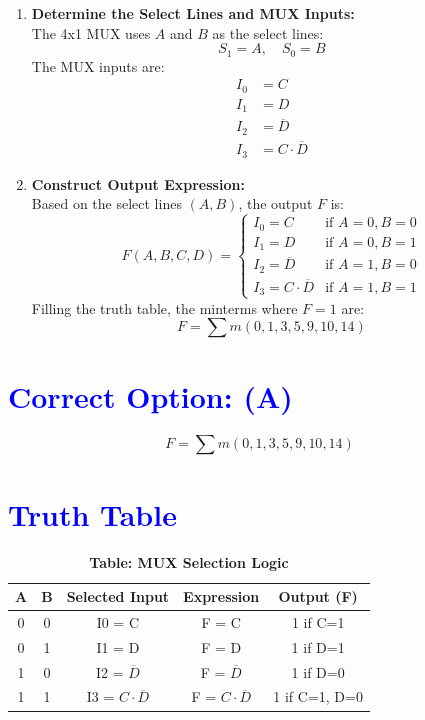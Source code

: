 \documentclass[twocolumn]{article}
\begin{document}
\begin{enumerate}[label=\textbf{Step \arabic*:}]
    \item \textbf{Determine the Select Lines and MUX Inputs:} \\
    The 4x1 MUX uses $A$ and $B$ as the select lines:
    \[
    S_1 = A, \quad S_0 = B
    \]
    The MUX inputs are:
    \begin{align*}
        I_0 &= C \\
        I_1 &= D \\
        I_2 &= \overline{D} \\
        I_3 &= C \cdot \overline{D}
    \end{align*}

\item \textbf{Construct Output Expression:} \\
    Based on the select lines $(A,B)$, the output $F$ is:
    \[
    F(A,B,C,D) = 
    \begin{cases}
    I_0 = C & \text{if } A=0, B=0 \\
    I_1 = D & \text{if } A=0, B=1 \\
    I_2 = \overline{D} & \text{if } A=1, B=0 \\
    I_3 = C \cdot \overline{D} & \text{if } A=1, B=1
    \end{cases}
    \]
    Filling the truth table, the minterms where $F=1$ are: \\
    \[
    F = \sum m(0, 1, 3, 5, 9, 10, 14)
    \]
\end{enumerate}

\section*{\textcolor{blue}{Correct Option: (A)}}
\[
F = \sum m(0,1,3,5,9,10,14)
\]

\section*{\textcolor{blue}{Truth Table}}
\begin{table}[h]
\centering
\renewcommand{\arraystretch}{1.3}
\begin{tabular}{|c|c|c|c|c|}
\hline
A & B & Selected Input & Expression & Output (F) \\
\hline
0 & 0 & I0 = C & F = C & 1 if C=1 \\
0 & 1 & I1 = D & F = D & 1 if D=1 \\
1 & 0 & I2 = $\overline{D}$ & F = $\overline{D}$ & 1 if D=0 \\
1 & 1 & I3 = $C\cdot\overline{D}$ & F = $C\cdot\overline{D}$ & 1 if C=1, D=0 \\
\hline
\end{tabular}
\caption*{\textbf{Table: MUX Selection Logic}}
\end{table}
\end{document}
